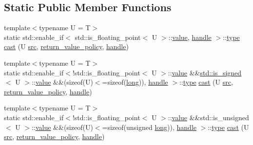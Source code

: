 \subsection*{Static Public Member Functions}
\begin{DoxyCompactItemize}
\item 
{\footnotesize template$<$typename U  = T$>$ }\\static std\+::enable\+\_\+if$<$ std\+::is\+\_\+floating\+\_\+point$<$ U $>$\+::\mbox{\hyperlink{_s_d_l__opengl__glext_8h_a8ad81492d410ff2ac11f754f4042150f}{value}}, \mbox{\hyperlink{classhandle}{handle}} $>$\+::\mbox{\hyperlink{_s_d_l__opengl_8h_ad5ddf6fca7b585646515660e810e0188}{type}} \mbox{\hyperlink{structtype__caster_3_01_t_00_01enable__if__t_3_01std_1_1is__arithmetic_3_01_t_01_4_1_1value_01_624f9972c532456d927e4470192416960_a2a74522a8e3d27c72ca51bebf2671157}{cast}} (U \mbox{\hyperlink{_s_d_l__opengl__glext_8h_a72e0fdf0f845ded60b1fada9e9195cd7}{src}}, \mbox{\hyperlink{detail_2common_8h_adde72ab1fb0dd4b48a5232c349a53841}{return\+\_\+value\+\_\+policy}}, \mbox{\hyperlink{classhandle}{handle}})
\item 
{\footnotesize template$<$typename U  = T$>$ }\\static std\+::enable\+\_\+if$<$!std\+::is\+\_\+floating\+\_\+point$<$ U $>$\+::\mbox{\hyperlink{_s_d_l__opengl__glext_8h_a8ad81492d410ff2ac11f754f4042150f}{value}} \&\&\mbox{\hyperlink{longobject_8h_ad9d9c8fff108a941e143d34a86eb36a2}{std\+::is\+\_\+signed}}$<$ U $>$\+::\mbox{\hyperlink{_s_d_l__opengl__glext_8h_a8ad81492d410ff2ac11f754f4042150f}{value}} \&\&(sizeof(U)$<$=sizeof(\mbox{\hyperlink{modsupport_8h_a0cb68e00fb9fb1260ee2daadd9fe6611}{long}})), \mbox{\hyperlink{classhandle}{handle}} $>$\+::\mbox{\hyperlink{_s_d_l__opengl_8h_ad5ddf6fca7b585646515660e810e0188}{type}} \mbox{\hyperlink{structtype__caster_3_01_t_00_01enable__if__t_3_01std_1_1is__arithmetic_3_01_t_01_4_1_1value_01_624f9972c532456d927e4470192416960_a3f5f3737a1b6c451ca5dc3477d1c1d3b}{cast}} (U \mbox{\hyperlink{_s_d_l__opengl__glext_8h_a72e0fdf0f845ded60b1fada9e9195cd7}{src}}, \mbox{\hyperlink{detail_2common_8h_adde72ab1fb0dd4b48a5232c349a53841}{return\+\_\+value\+\_\+policy}}, \mbox{\hyperlink{classhandle}{handle}})
\item 
{\footnotesize template$<$typename U  = T$>$ }\\static std\+::enable\+\_\+if$<$!std\+::is\+\_\+floating\+\_\+point$<$ U $>$\+::\mbox{\hyperlink{_s_d_l__opengl__glext_8h_a8ad81492d410ff2ac11f754f4042150f}{value}} \&\&std\+::is\+\_\+unsigned$<$ U $>$\+::\mbox{\hyperlink{_s_d_l__opengl__glext_8h_a8ad81492d410ff2ac11f754f4042150f}{value}} \&\&(sizeof(U)$<$=sizeof(unsigned \mbox{\hyperlink{modsupport_8h_a0cb68e00fb9fb1260ee2daadd9fe6611}{long}})), \mbox{\hyperlink{classhandle}{handle}} $>$\+::\mbox{\hyperlink{_s_d_l__opengl_8h_ad5ddf6fca7b585646515660e810e0188}{type}} \mbox{\hyperlink{structtype__caster_3_01_t_00_01enable__if__t_3_01std_1_1is__arithmetic_3_01_t_01_4_1_1value_01_624f9972c532456d927e4470192416960_aabcc3b2b1d04ead58d2b0ad1e580d92f}{cast}} (U \mbox{\hyperlink{_s_d_l__opengl__glext_8h_a72e0fdf0f845ded60b1fada9e9195cd7}{src}}, \mbox{\hyperlink{detail_2common_8h_adde72ab1fb0dd4b48a5232c349a53841}{return\+\_\+value\+\_\+policy}}, \mbox{\hyperlink{classhandle}{handle}})

\end{DoxyCompactItemize}
